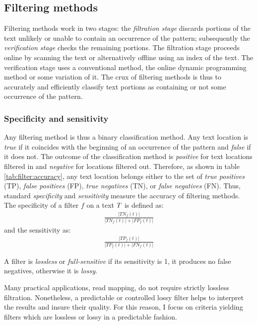 
\subsection{Filtering methods}
\label{sec:intro:filtering}

Filtering methods work in two stages: the \emph{filtration stage} discards portions of the text unlikely or unable to contain an occurrence of the pattern; subsequently the \emph{verification stage} checks the remaining portions.
The filtration stage proceeds online by scanning the text or alternatively offline using an index of the text.
The verification stage uses a conventional method, \eg the online dynamic programming method or some variation of it.
The crux of filtering methods is thus to accurately and efficiently classify text portions as containing or not some occurrence of the pattern.

\subsubsection{Specificity and sensitivity}
\label{intro:filtering:spec-sens}

Any filtering method is thus a binary classification method.
Any text location is \emph{true} if it coincides with the beginning of an occurrence of the pattern and \emph{false} if it does not.
The outcome of the classification method is \emph{positive} for text locations filtered in and \emph{negative} for locations filtered out.
Therefore, as shown in table \ref{tab:filter:accuracy}, any text location belongs either to the set of \emph{true positives} (TP), \emph{false positives} (FP), \emph{true negatives} (TN), or \emph{false negatives} (FN).
Thus, standard \emph{specificity} and \emph{sensitivity} measure the accuracy of filtering methods.
The specificity of a filter $f$ on a text $T$ is defined as:
\begin{eqnarray}
\frac{|TN_f(t)|}{|TN_f(t)| + |FP_f(t)|}
\end{eqnarray}
and the sensitivity as:
\begin{eqnarray}
\frac{|TP_f(t)|}{|TP_f(t)| + |FN_f(t)|}
\end{eqnarray}

\begin{definition}
A filter is \emph{lossless} or \emph{full-sensitive} if its sensitivity is 1, \ie it produces no false negatives, otherwise it is \emph{lossy}.
\end{definition}
Many practical applications, \eg read mapping, do not require strictly lossless filtration.
Nonetheless, a predictable or controlled lossy filter helps to interpret the results and insure their quality.
For this reason, I focus on criteria yielding filters which are lossless or lossy in a predictable fashion.

